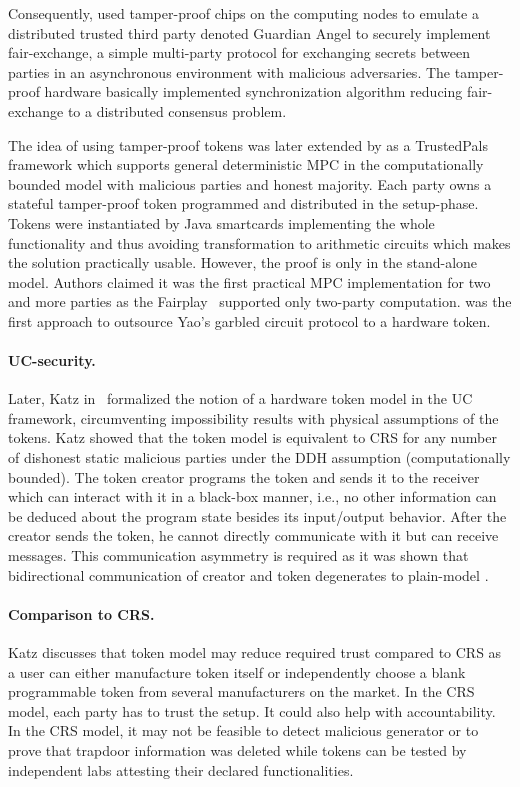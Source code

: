 \documentclass[
  digital, %
  twoside, %
  table,   %
  lof,     %
  lot,     %
]{fithesis3}
\newcounter{ph4_show_guides}
\theoremstyle{definition}
\theoremstyle{remark}
\begin{document}
Consequently, \cite{AV04} used tamper-proof chips on the computing nodes to emulate a distributed trusted third party denoted Guardian Angel to securely implement fair-exchange, a simple multi-party protocol for exchanging secrets between parties in an asynchronous environment with malicious adversaries. The tamper-proof hardware basically implemented synchronization algorithm reducing fair-exchange to a distributed consensus problem. 

The idea of using tamper-proof tokens was later extended by \cite{FFPBK06} as a TrustedPals framework which supports general deterministic MPC in the computationally bounded model with malicious parties and honest majority. Each party owns a stateful tamper-proof token programmed and distributed in the setup-phase. Tokens were instantiated by Java smartcards implementing the whole functionality \cite{DW99} and thus avoiding transformation to arithmetic circuits which makes the solution practically usable. However, the proof is only in the stand-alone model. Authors claimed it was the first practical MPC implementation for two and more parties as the Fairplay~\cite{MNPS04} supported only two-party computation.
\cite{JKSS10} was the first approach to outsource Yao's garbled circuit protocol to a hardware token.

\paragraph{UC-security.} %
Later, Katz in~\cite{K07} formalized the notion of a hardware token model in the UC framework, circumventing impossibility results with physical assumptions of the tokens. Katz showed that the token model is equivalent to CRS for any number of dishonest static malicious parties under the DDH assumption (computationally bounded). %
The token creator programs the token and sends it to the receiver which can interact with it in a black-box manner, i.e., no other information can be deduced about the program state besides its input/output behavior. %
After the creator sends the token, he cannot directly communicate with it but can receive messages. This communication asymmetry is required as it was shown that bidirectional communication of creator and token degenerates to plain-model \cite{CGS08}.

\paragraph{Comparison to CRS.} %
Katz discusses that token model may reduce required trust compared to CRS as a user can either manufacture token itself or independently choose a blank programmable token from several manufacturers on the market. In the CRS model, each party has to trust the setup.
It could also help with accountability. In the CRS model, it may not be feasible to detect malicious generator or to prove that trapdoor information was deleted while tokens can be tested by independent labs attesting their declared functionalities.
\end{document}
